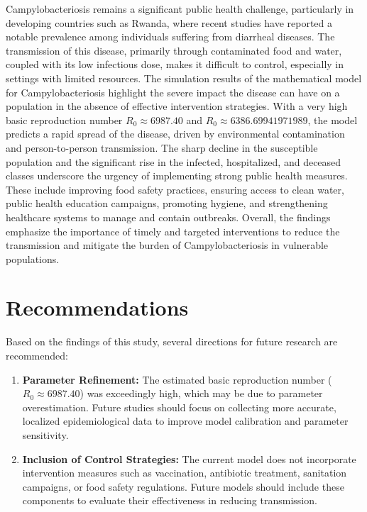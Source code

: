 \documentclass[a4paper,12pt]{report}
\begin{document}
\begin{itemize}
Campylobacteriosis remains a significant public health challenge, particularly in developing countries such as Rwanda, where recent studies have reported a notable prevalence among individuals suffering from diarrheal diseases. The transmission of this disease, primarily through contaminated food and water, coupled with its low infectious dose, makes it difficult to control, especially in settings with limited resources. The simulation results of the mathematical model for Campylobacteriosis highlight the severe impact the disease can have on a population in the absence of effective intervention strategies. With a very high basic reproduction number $R_0 \approx 6987.40$ and $R_0 \approx 6386.69941971989$, the model predicts a rapid spread of the disease, driven by environmental contamination and person-to-person transmission. The sharp decline in the susceptible population and the significant rise in the infected, hospitalized, and deceased classes underscore the urgency of implementing strong public health measures. These include improving food safety practices, ensuring access to clean water, public health education campaigns, promoting hygiene, and strengthening healthcare systems to manage and contain outbreaks. Overall, the findings emphasize the importance of timely and targeted interventions to reduce the transmission and mitigate the burden of Campylobacteriosis in vulnerable populations.


\section{Recommendations}


Based on the findings of this study, several directions for future research are recommended:

\begin{enumerate}
    \item \textbf{Parameter Refinement:} The estimated basic reproduction number ($R_0 \approx 6987.40$) was exceedingly high, which may be due to parameter overestimation. Future studies should focus on collecting more accurate, localized epidemiological data to improve model calibration and parameter sensitivity.

    \item \textbf{Inclusion of Control Strategies:} The current model does not incorporate intervention measures such as vaccination, antibiotic treatment, sanitation campaigns, or food safety regulations. Future models should include these components to evaluate their effectiveness in reducing transmission.


\end{enumerate}
\end{itemize}
\end{document}

